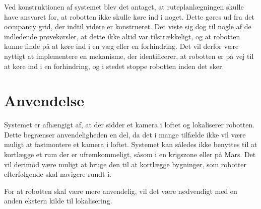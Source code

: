 Ved konstruktionen af systemet blev det antaget, at ruteplanlægningen skulle have ansvaret for, at robotten ikke skulle køre ind i noget. 
Dette gøres ud fra det occupancy grid, der indtil videre er konstrueret.
Det viste sig dog til nogle af de indledende prøvekørsler, at dette ikke altid var tilstrækkeligt, og at robotten kunne finde på at køre ind i en væg eller en forhindring.
Det vil derfor være nyttigt at implementere en mekanisme, der identificerer, at robotten er på vej til at køre ind i en forhindring, og i stedet stoppe robotten inden det sker. 

\section{Anvendelse}
Systemet er afhængigt af, at der sidder et kamera i loftet og lokaliserer robotten.
Dette begrænser anvendeligheden en del, da det i mange tilfælde ikke vil være muligt at fastmontere et kamera i loftet.
Systemet kan således ikke benyttes til at kortlægge et rum der er ufremkommeligt, såsom i en krigszone eller på Mars.
Det vil derimod være muligt at bruge den til at kortlægge bygninger, som robotter efterfølgende skal navigere rundt i.

For at robotten skal være mere anvendelig, vil det være nødvendigt med en anden ekstern kilde til lokalisering.